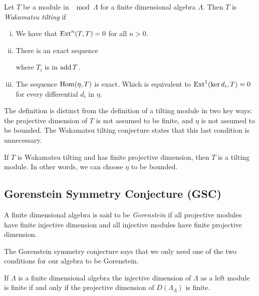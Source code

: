 \begin{defn}
	Let $T$ be a module in $\mod\Lambda$ for a finite dimensional algebra $\Lambda$. Then $T$ is \emph{Wakamatsu tilting} if
	\begin{enumerate}[i)]
		\item We have that $\operatorname{Ext}^n(T,T)=0$ for all $n >0$.
		\item There is an exact sequence 
		\begin{center}
		\end{center}
		where $T_i$ is in $\operatorname{add} T$.
		\item The sequence $\operatorname{Hom}(\eta, T)$ is exact. Which is equivalent to $\operatorname{Ext}^1(\operatorname{ker} d_i, T)=0$ for every differential $d_i$ in $\eta$.
	\end{enumerate}
\end{defn}

The definition is distinct from the definition of a tilting module in two key ways: the projective dimension of $T$ is not assumed to be finite, and $\eta$ is not assumed to be bounded. The Wakamatsu tilting conjecture states that this last condition is unnecessary.

\begin{conj} 
	If $T$ is Wakamatsu tilting and has finite projective dimension, then $T$ is a tilting module. In other words, we can choose $\eta$ to be bounded.
\end{conj}

\subsection*{Gorenstein Symmetry Conjecture (GSC)}

\begin{defn}
	A finite dimensional algebra is said to be \emph{Gorenstein} if all projective modules have finite injective dimension and all injective modules have finite projective dimension.
\end{defn}

The Gorenstein symmetry conjecture says that we only need one of the two conditions for our algebra to be Gorenstein.

\begin{conj} 
	If $\Lambda$ is a finite dimensional algebra the injective dimension of $\Lambda$ as a left module is finite if and only if the projective dimension of $D(\Lambda_\Lambda)$ is finite.
\end{conj}


